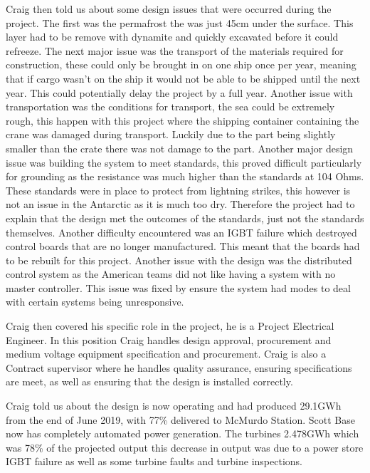 \documentclass{article}
\begin{document}
Craig then told us about some design issues that were occurred during the project. The first was
the permafrost the was just 45cm under the surface. This layer had to be remove with dynamite and
quickly excavated before it could refreeze. The next major issue was the transport of the
materials required for construction, these could only be brought in on one ship once per year,
meaning that if cargo wasn't on the ship it would not be able to be shipped until the next year.
This could potentially delay the project by a full year. Another issue with transportation was the
conditions for transport, the sea could be extremely rough, this happen with this project where
the shipping container containing the crane was damaged during transport. Luckily due to the part
being slightly smaller than the crate there was not damage to the part. Another major design issue
was building the system to meet standards, this proved difficult particularly for grounding as the
resistance was much higher than the standards at 104 Ohms. These standards were in place to
protect from lightning strikes, this however is not an issue in the Antarctic as it is much too
dry. Therefore the project had to explain that the design met the outcomes of the standards, just
not the standards themselves. Another difficulty encountered was an IGBT failure which destroyed
control boards that are no longer manufactured. This meant that the boards had to be rebuilt for
this project. Another issue with the design was the distributed control system as the American
teams did not like having a system with no master controller. This issue was fixed by ensure the
system had modes to deal with certain systems being unresponsive.

Craig then covered his specific role in the project, he is a Project Electrical Engineer. In this
position Craig handles design approval, procurement and medium voltage equipment specification and
procurement. Craig is also a Contract supervisor where he handles quality assurance, ensuring
specifications are meet, as well as ensuring that the design is installed correctly.

Craig told us about the design is now operating and had produced 29.1GWh from the end of June
2019, with 77\% delivered to McMurdo Station. Scott Base now has completely automated
power generation. The turbines 2.478GWh which was 78\% of the projected output this decrease in
output was due to a power store IGBT failure as well as some turbine faults and turbine
inspections.
\end{document}
